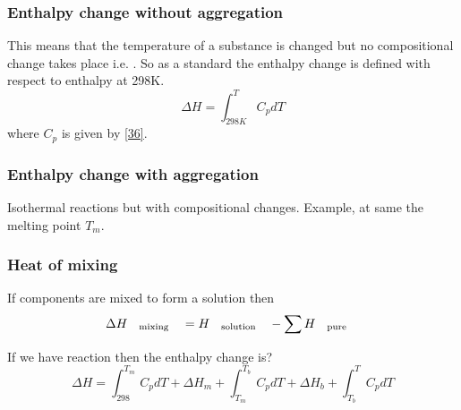 \documentclass[12pt]{article}
\begin{document}
	 \subsubsection{Enthalpy change without aggregation} 
	 This means that the temperature of a substance is changed but no compositional change takes place i.e. . So as a standard the enthalpy change is defined with respect to enthalpy at 298K. 
	$$\Delta H=\int_{298K}^{T}C_pdT$$ where $C_p$ is given by \eqref{36}.
	
	\subsubsection{Enthalpy change with aggregation} 
	Isothermal reactions but with compositional changes. Example,  at same the melting point $T_m$. 
	\subsubsection{Heat of mixing}
	If components are mixed to form a solution then $$\Delta H_{\qq{mixing}}=H_{\qq{solution}}-\sum H_{\qq{pure}} $$


\begin{tcolorbox}[title=Example]
	If we have reaction  then the enthalpy change is?
	\tcblower
    \begin{equation}
    	\Delta H=\int_{298}^{T_m}C_p dT + \Delta H_m +\int_{T_m}^{T_b} C_p dT + \Delta H_b + \int_{T_b}^{T} C_p dT
    \end{equation}
\end{tcolorbox}
\end{document}
